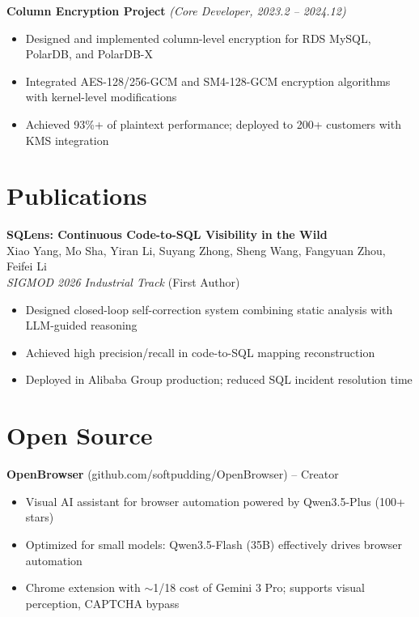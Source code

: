 \documentclass[11pt,a4paper]{article}
\begin{document}
\vspace{4pt}

\noindent\textbf{Column Encryption Project} \textit{(Core Developer, 2023.2 -- 2024.12)}
\begin{itemize}
    \item Designed and implemented column-level encryption for RDS MySQL, PolarDB, and PolarDB-X
    \item Integrated AES-128/256-GCM and SM4-128-GCM encryption algorithms with kernel-level modifications
    \item Achieved 93\%+ of plaintext performance; deployed to 200+ customers with KMS integration
\end{itemize}

\vspace{4pt}

\section{Publications}
\noindent\textbf{SQLens: Continuous Code-to-SQL Visibility in the Wild}\\
Xiao Yang, Mo Sha, Yiran Li, Suyang Zhong, Sheng Wang, Fangyuan Zhou, Feifei Li\\
\textit{SIGMOD 2026 Industrial Track} (First Author)
\begin{itemize}
    \item Designed closed-loop self-correction system combining static analysis with LLM-guided reasoning
    \item Achieved high precision/recall in code-to-SQL mapping reconstruction
    \item Deployed in Alibaba Group production; reduced SQL incident resolution time
\end{itemize}

\vspace{4pt}

\section{Open Source}
\noindent\textbf{OpenBrowser} (github.com/softpudding/OpenBrowser) -- Creator
\begin{itemize}
    \item Visual AI assistant for browser automation powered by Qwen3.5-Plus (100+ stars)
    \item Optimized for small models: Qwen3.5-Flash (35B) effectively drives browser automation
    \item Chrome extension with $\sim$1/18 cost of Gemini 3 Pro; supports visual perception, CAPTCHA bypass
\end{itemize}
\end{document}
